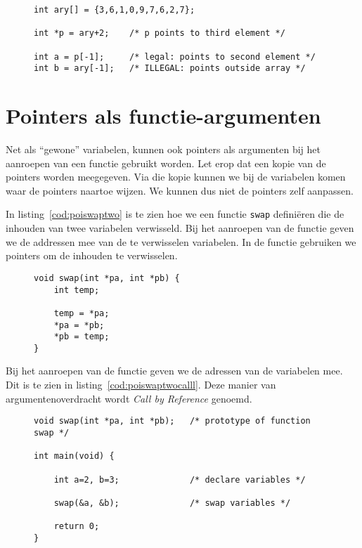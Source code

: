 \begin{figure}[!ht]
\begin{lstlisting}[caption=Pointer die naar een element in een array wijst.,label=cod:poipointstonegeindex]
int ary[] = {3,6,1,0,9,7,6,2,7};

int *p = ary+2;    /* p points to third element */

int a = p[-1];     /* legal: points to second element */
int b = ary[-1];   /* ILLEGAL: points outside array */
\end{lstlisting}
\end{figure}


\section{Pointers als functie-argumenten}
\label{sec:pointersalsfunctieargumenten}
Net als ``gewone'' variabelen, kunnen ook pointers als argumenten bij het aanroepen van een functie gebruikt worden. Let erop dat een kopie van de pointers worden meegegeven. Via die kopie kunnen we bij de variabelen komen waar de pointers naartoe wijzen. We kunnen dus niet de pointers zelf aanpassen.

In listing~\ref{cod:poiswaptwo} is te zien hoe we een functie \texttt{swap} definiëren die de inhouden van twee variabelen verwisseld. Bij het aanroepen van de functie geven we de addressen mee van de te verwisselen variabelen. In de functie gebruiken we pointers om de inhouden te verwisselen.

\begin{figure}[!ht]
\begin{lstlisting}[caption=Het verwisselen van twee variabelen met behulp van pointers.,label=cod:poiswaptwo]
void swap(int *pa, int *pb) {
	int temp;

    temp = *pa;
    *pa = *pb;
    *pb = temp;
}
\end{lstlisting}
\end{figure}

Bij het aanroepen van de functie geven we de adressen van de variabelen mee. Dit is te zien in listing~\ref{cod:poiswaptwocalll}. Deze manier van argumentenoverdracht wordt \textsl{Call by Reference} genoemd.

\begin{figure}[!ht]
\begin{lstlisting}[caption=Aanroep van de functie.,label=cod:poiswaptwocalll]
void swap(int *pa, int *pb);   /* prototype of function swap */

int main(void) {

    int a=2, b=3;              /* declare variables */

    swap(&a, &b);              /* swap variables */

    return 0;
}
\end{lstlisting}
\end{figure}

